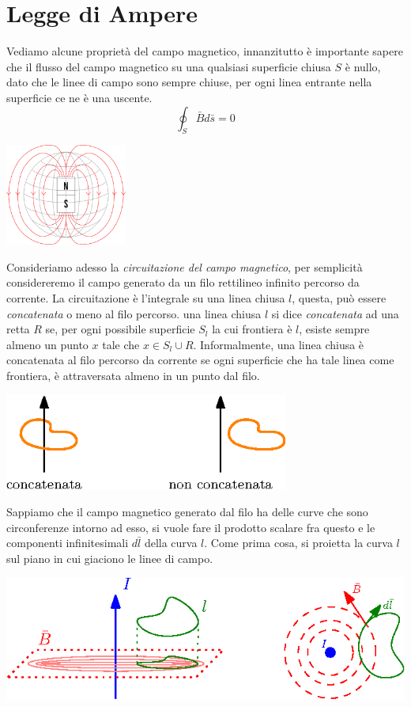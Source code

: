 \documentclass[10pt, letterpaper]{report}
\begin{document}
\section{Legge di Ampere}
Vediamo alcune proprietà del campo magnetico, innanzitutto è importante sapere che il flusso del campo magnetico su una qualsiasi superficie chiusa $S$ è nullo, dato che le linee di campo sono sempre chiuse, per ogni linea entrante nella superficie ce ne è una uscente. 
$$ \oint_S \bar B d\bar s = 0$$\begin{center}
    \includegraphics[width=0.3\textwidth ]{images/flussoMagnetico.png}
\end{center}
Consideriamo adesso la \textit{circuitazione del campo magnetico}, per semplicità considereremo il campo generato da un filo rettilineo infinito percorso da corrente. La circuitazione è l'integrale su una linea chiusa $l$, questa, può essere \textit{concatenata} o meno al filo percorso.\acc 
{} una linea chiusa $l$ si dice \textit{concatenata} ad una retta $R$ se, per ogni possibile superficie $S_l$ la cui frontiera è $l$, esiste sempre almeno un punto $x$ tale che $x\in S_l \cup R$.\acc 
Informalmente, una linea chiusa è concatenata al filo percorso da corrente se ogni superficie che ha tale linea come frontiera, è attraversata almeno in un punto dal filo.\begin{center}
    \includegraphics[width=0.7\textwidth ]{images/concatenata.eps}
\end{center}
Sappiamo che il campo magnetico generato dal filo ha delle curve che sono circonferenze intorno ad esso, si vuole fare il prodotto scalare fra questo e le componenti infinitesimali $d\bar l$ della curva $l$. Come prima cosa, si proietta la curva $l$ sul piano in cui giaciono le linee di campo.\begin{center}
    \includegraphics[width=\textwidth ]{images/CircuitazioneCampoMagnetico.eps}
\end{center}
\end{document}
